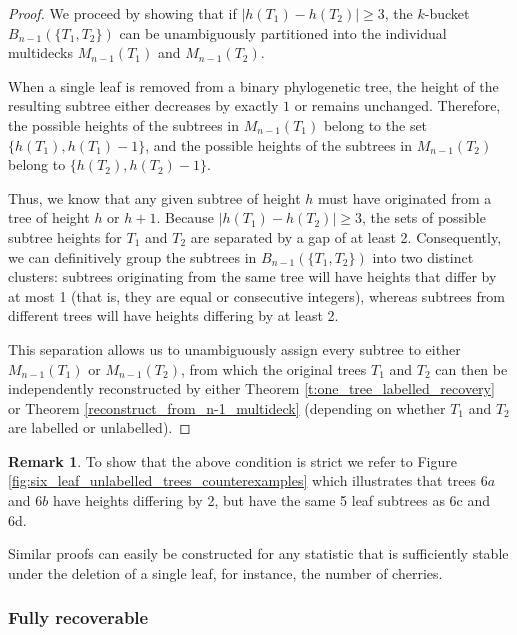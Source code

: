 \documentclass[12pt]{article}
\theoremstyle{definition}
\newtheorem{Remark}[Theorem]{Remark}
\begin{document}
\begin{proof}
    We proceed by showing that if $|h(T_1) - h(T_2)| \geq 3$, the $k$-bucket $B_{n-1}(\{T_1, T_2\})$ can be unambiguously partitioned into the individual multidecks $M_{n-1}(T_1)$ and $M_{n-1}(T_2)$.
    
    When a single leaf is removed from a binary phylogenetic tree, the height of the resulting subtree either decreases by exactly $1$ or remains unchanged. Therefore, the possible heights of the subtrees in $M_{n-1}(T_1)$ belong to the set $\{h(T_1), h(T_1) - 1\}$, and the possible heights of the subtrees in $M_{n-1}(T_2)$ belong to $\{h(T_2), h(T_2) - 1\}$.

    Thus, we know that any given subtree of height $h$ must have originated from a tree of height $h$ or $h + 1$. Because $|h(T_1) - h(T_2)| \geq 3$, the sets of possible subtree heights for $T_1$ and $T_2$ are separated by a gap of at least 2. Consequently, we can definitively group the subtrees in $B_{n-1}(\{T_1, T_2\})$ into two distinct clusters: subtrees originating from the same tree will have heights that differ by at most 1 (that is, they are equal or consecutive integers), whereas subtrees from different trees will have heights differing by at least 2. 
    
    This separation allows us to unambiguously assign every subtree to either $M_{n-1}(T_1)$ or $M_{n-1}(T_2)$, from which the original trees $T_1$ and $T_2$ can then be independently reconstructed by either Theorem \ref{t:one_tree_labelled_recovery} or Theorem \ref{reconstruct_from_n-1_multideck} (depending on whether $T_1$ and $T_2$ are labelled or unlabelled).
\end{proof}

\begin{Remark}
    To show that the above condition is strict  we refer to Figure \ref{fig:six_leaf_unlabelled_trees_counterexamples} which illustrates that trees $6a$ and $6b$ have heights differing by 2, but have the same 5 leaf subtrees as 6c and 6d. 
\end{Remark}

Similar proofs can easily be constructed for any statistic that is sufficiently stable under the deletion of a single leaf, for instance, the number of cherries.

\subsubsection{Fully recoverable}
\end{document}
